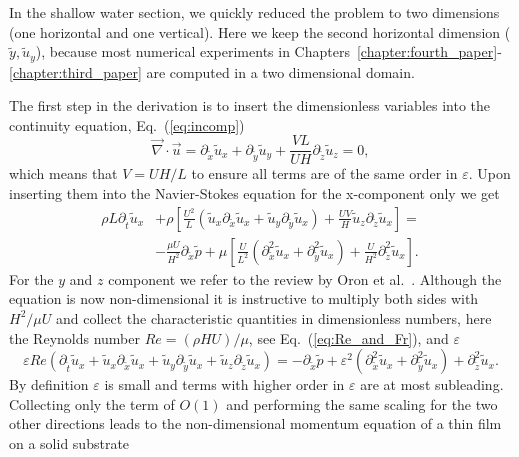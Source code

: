 In the shallow water section, we quickly reduced the problem to two dimensions (one horizontal and one vertical).
Here we keep the second horizontal dimension ($\tilde{y}, \tilde{u}_y$), because most numerical experiments in Chapters~\ref{chapter:fourth_paper}-\ref{chapter:third_paper} are computed in a two dimensional domain. 
 
The first step in the derivation is to insert the dimensionless variables into the continuity equation, Eq.~(\ref{eq:incomp})
\begin{equation}\label{eq:cont_thin_film_1}
     \vec{\nabla}\cdot\vec{u} = \partial_{\tilde{x}} \tilde{u}_x + \partial_{\tilde{y}} \tilde{u}_y + \frac{V L}{U H}\partial_{\tilde{z}} \tilde{u}_z = 0,
\end{equation}
which means that $V = U H/L$ to ensure all terms are of the same order in $\varepsilon$.
Upon inserting them into the Navier-Stokes equation for the x-component only we get
\begin{align}
     \rho L \partial_{\tilde{t}}\tilde{u}_x &+ \rho\left[\frac{U^2}{L}\left(\tilde{u}_x\partial_{\tilde{x}}\tilde{u}_x + \tilde{u}_y\partial_{\tilde{y}}\tilde{u}_x\right) + \frac{U V}{H}\tilde{u}_z\partial_{\tilde{z}}\tilde{u}_x\right] = \nonumber \\ &-\frac{\mu U}{H^2} \partial_{\tilde{x}} \tilde{p} + \mu\left[\frac{U}{L^2}(\partial^2_{\tilde{x}}\tilde{u}_x + \partial^2_{\tilde{y}}\tilde{u}_x) + \frac{U}{H^2}\partial^2_{\tilde{z}}\tilde{u}_x\right].
\end{align}
For the $y$ and $z$ component we refer to the review by Oron et al.~\cite{oronLongscaleEvolutionThin1997}.
Although the equation is now non-dimensional it is instructive to multiply both sides with $H^2/\mu U$ and collect the characteristic quantities in dimensionless numbers, here the Reynolds number $Re = (\rho H U)/\mu$, see Eq.~(\ref{eq:Re_and_Fr}), and $\varepsilon$  
\begin{equation}
    \varepsilon Re \left(\partial_{\tilde{t}}\tilde{u}_x + \tilde{u}_x\partial_{\tilde{x}}\tilde{u}_x + \tilde{u}_y\partial_{\tilde{y}}\tilde{u}_x + \tilde{u}_z\partial_{\tilde{z}}\tilde{u}_x \right) = -\partial_{\tilde{x}}\tilde{p} + \varepsilon^2\left(\partial^2_{\tilde{x}}\tilde{u}_x + \partial^2_{\tilde{y}}\tilde{u}_x\right) + \partial^2_{\tilde{z}}\tilde{u}_x. 
\end{equation}
By definition $\varepsilon$ is small and terms with higher order in $\varepsilon$ are at most subleading.
Collecting only the term of $O(1)$ and performing the same scaling for the two other directions leads to the non-dimensional momentum equation of a thin film on a solid substrate
